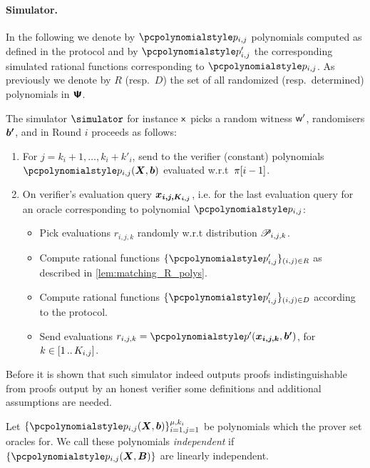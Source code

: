\documentclass[runningheads,11pt]{llncs}
\let\spvec\vec
\let\vec\accentvec
\let\spvec\vec
\let\vec\spvec
\def\vec#1{\mathchoice{\mbox{\boldmath$\displaystyle#1$}}
  {\mbox{\boldmath$\textstyle#1$}} {\mbox{\boldmath$\scriptstyle#1$}}
  {\mbox{\boldmath$\scriptscriptstyle#1$}}}
\begin{document}
  \paragraph{Simulator.}
  In the following we denote by $\p{p}_{i, j}$ polynomials
  computed as defined in the protocol and by $\p{p}'_{i, j}$ the corresponding
  simulated rational functions corresponding to $\p{p}_{i, j}$. As previously we
  denote by $R$ (resp.~$D$) the set of all randomized (resp.~determined)
  polynomials in $\bm{\mathsf{\Psi}}$.

  The simulator $\simulator$ for instance $\mathsf{x}$ picks a random witness $\mathsf{w}'$,
  randomisers $\vec{b'}$, and in Round $i$ proceeds as follows:
  \begin{enumerate}
  \item {}
    For $j = k_i + 1, \ldots, k_i + k'_i$, send to the verifier (constant) polynomials
    $\p{p}_{i, j} (\vec{X}, \vec{b})$ evaluated w.r.t~$\pi[i - 1]$.
  \item On verifier's evaluation query $\vec{x_{i, j, K_{i, j}}}$, i.e. for the last
    evaluation query for an oracle corresponding to polynomial $\p{p}_{i, j}$:
    \begin{itemize}
    \item Pick evaluations $r_{i, j, k}$ randomly w.r.t distribution
      $\mathscr{P}_{i, j, k}$.
    \item Compute rational functions $\smallset{\p{p}'_{i, j}}_{(i, j) \in R}$ as described
      in \cref{lem:matching_R_polys}. 
    \item Compute rational functions $\smallset{\p{p}'_{i, j}}_{(i, j) \in D}$
      according to the protocol.
    \item Send evaluations $r_{i, j, k} = \p{p}' (\vec{x_{i, j, k}}, \vec{b'})$, for
      $k \in [1 \, .. \, K_{i, j}]$.
    \end{itemize}
  \end{enumerate}

  Before it is shown that such simulator indeed outputs proofs indistinguishable from
  proofs output by an honest verifier some definitions and additional assumptions are needed.
    
\begin{definition}
  Let $\smallset{\p{p}_{i, j} (\vec{X}, \vec{b})}_{i = 1, j = 1}^{\mu, k_i}$ be polynomials
  which the prover set oracles for. We call these polynomials \emph{independent} if
  $\smallset{\p{p}_{i, j} (\vec{X}, \vec{B})}$ are linearly independent.
\end{definition}
\end{document}
